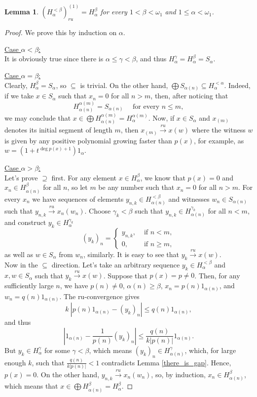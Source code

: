 \documentclass[10pt,a4paper]{amsart}
\newtheorem{lemma}{Lemma}
\renewcommand{\a}{\alpha}
\renewcommand{\b}{\beta}
\newcommand{\g}{\gamma}
\newcommand{\w}{\omega}
\begin{document}
\begin{lemma}\label{H_is_closed}
$ (H_\a^{<\b})_{ru}^{(1)} = H_\a^\b $ for every $ 1 < \b < \w_1 $ and $ 1 \leqslant \a < \w_1 $.
\end{lemma}

\begin{proof}
We prove this by induction on $ \alpha $.

\medskip\noindent
\underline{Case $ \a < \b $:}\\
It is obviously true since there is $ \a \leqslant \g < \b $, and thus $ H_\a^\g = H_\a^\b = S_\a $.

\medskip\noindent
\underline{Case $ \a = \b $:}\\
Clearly, $ H_\a^\b = S_\a $, so $ \subseteq $ is trivial.
On the other hand, $ \bigoplus S_{\a(n)} \subseteq H_\a^{<\a} $. Indeed, if we take $ x \in S_\a $ such that $ x_n = 0 $ for all $ n > m $, then, after noticing that
$$
	H_{\a(n)}^{\a(m)} = S_{\a(n)} \quad\text{ for every } n \leqslant m,
$$
we may conclude that $ x \in \bigoplus H_{\a(n)}^{\a(m)} = H_\a^{\a(m)} $.
Now, if $ x \in S_\a $ and $ x_{(m)} $ denotes its initial segment of length $ m $, then $ x_{(m)}\overset{ru}{\rightarrow} x (w) $ 
where the witness $ w $ is given by any positive polynomial growing faster than $ p(x) $, for example, as $ w = (1+t^{\deg p(x) + 1})1_\a $.

\medskip\noindent
\underline{Case $ \a > \b $:}\\
Let's prove $ \supseteq $ first.
For any element $ x \in H_\a^\b $, we know that $ p(x) = 0 $ and $ x_n \in H_{\a(n)}^\b $ for all $ n $, so let $ m $ be any number such that $ x_n = 0 $ for all $ n > m $.
For every $ x_n $ we have sequences of elements $ y_{n, k} \in H_{\a(n)}^{<\b} $ and witnesses 
$ w_n \in S_{\a(n)} $ such that $ y_{n, k}  \overset{ru}{\rightarrow} x_n (w_n) $.
Choose $ \g_k < \b $ such that $ y_{n, k} \in H_{\a(n)}^{\g_k} $ for all $ n < m $, and construct $ y_k \in H_\a^{\g_k} $
$$
	(y_k)_n = 
	\begin{cases}
		y_{n, k}, & \text{ if } n < m, \\
		0, & \text{ if } n \geqslant m,
	\end{cases}
$$
as well as $ w \in S_\a $ from $ w_n $, similarly.
It is easy to see that $ y_k  \overset{ru}{\rightarrow} x (w) $.
\\
Now in the $ \subseteq $ direction.
Let's take an arbitrary sequence $ y_k \in H_\a^{<\b} $ and $ x, w \in S_\a $ such that $ y_k  \overset{ru}{\rightarrow} x (w) $.
Suppose that $ p(x) = p \neq 0 $. Then, for any sufficiently large $ n $, we have $ p(n) \neq 0 $, $ \a(n) \geqslant \b $, $ x_n = p(n) 1_{\a(n)} $, 
and $ w_n = q(n) 1_{\a(n)} $. The ru-convergence gives
$$
	k \ |p(n) 1_{\a(n)} - (y_k)_n | \leqslant q(n) 1_{\a(n)},
$$
and thus
$$
	| 1_{\a(n)} - \frac{1}{p(n)}(y_k)_n | \leqslant \frac{q(n)}{k|p(n)|} 1_{\a(n)}.
$$
But $ y_k \in H_{\a}^\g $ for some $ \g < \b $, which means $ (y_k)_n \in H_{\a(n)}^\g $, which, for large enough $ k $, such that $  \frac{q(n)}{k|p(n)|} < 1 $ 
contradicts Lemma \ref{there_is_gap}.
Hence, $ p(x) = 0 $. On the other hand, $ y_{n, k}  \overset{ru}{\rightarrow} x_n (w_n) $, so, by induction, $ x_n \in H_{\a(n)}^\b $, 
which means that $ x \in \bigoplus H_{\a(n)}^\b = H_\a^\b $.
\end{proof}
\end{document}
